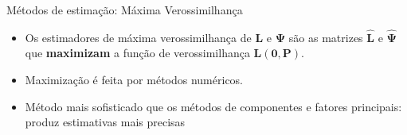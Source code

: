 \documentclass[
  ignorenonframetext,
  aspectratio=169,
]{beamer}
\providecommand{\tightlist}{%
  \setlength{\itemsep}{0pt}\setlength{\parskip}{0pt}}
\begin{document}
\begin{frame}{Métodos de estimação: Máxima Verossimilhança}
\label{muxe9todos-de-estimauxe7uxe3o-muxe1xima-verossimilhanuxe7a-2}
\begin{itemize}
\tightlist
\item
  Os estimadores de máxima verossimilhança de \(\boldsymbol{L}\) e
  \(\boldsymbol{\Psi}\) são as matrizes \(\hat{\boldsymbol{L}}\) e
  \(\hat{\boldsymbol{\Psi}}\) que \textbf{maximizam} a função de
  verossimilhança \(\boldsymbol{L}(\boldsymbol{0},\boldsymbol{P})\).
\end{itemize}

\pause

\begin{itemize}
\tightlist
\item
  Maximização é feita por métodos numéricos.
\end{itemize}

\pause

\begin{itemize}
\tightlist
\item
  Método mais sofisticado que os métodos de componentes e fatores
  principais: produz estimativas mais precisas
\end{itemize}
\end{frame}
\end{document}

